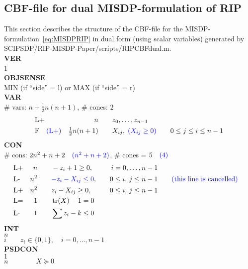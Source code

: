 \documentclass[11pt,a4paper]{article}
\DeclareMathOperator{\tr}{tr}
\theoremstyle{definition}
\begin{document}
\subsection{CBF-file for dual MISDP-formulation of RIP}
\label{sec:CBFdual}
This section describes the structure of the CBF-file for the
MISDP-formulation~\eqref{eq:MISDPRIP} in dual form (using scalar variables)
generated by
\textsf{SCIPSDP/RIP-MISDP-Paper/scripts/RIPCBFdual.m}.\\


{\footnotesize
\noindent
\textbf{VER} \\
1 \\
\textbf{OBJSENSE} \\
MIN (if ``side'' = l) \; or \; MAX (if ``side'' = r) \\
\textbf{VAR} \\
\# vars:  $n+\tfrac{1}{2}n(n+1)$, \qquad \# cones: $2$ \\
\[
  \begin{aligned}
    &\text{L+} &n \qquad & z_0,\dots,z_{n-1} \\
    &\text{F}\quad{\color{blue} (\text{L}+)}  &\tfrac{1}{2}n(n+1) \qquad & X_{ij},\;
    {\color{blue} (X_{ij} \geq 0)} \qquad 0 \leq j \leq i \leq n-1
  \end{aligned}
\]
\textbf{CON} \\
\# cons: $2n^2+n+2 \quad {\color{blue}(n^2+n+2)}$, \qquad
\# cones = $5 \quad {\color{blue} (4)}$\\
\[
  \begin{aligned}
    &\text{L+} &n \qquad & -z_i + 1 \geq 0, \quad & i = 0,\dots,n-1 \\
    &\text{L-} &n^2 \qquad & {\color{blue}-z_i - X_{ij} \leq 0},\quad & 0
    \leq i,\, j \leq n-1 &\qquad {\color{blue} \text{(this line is cancelled)}}\\
    &\text{L+} &n^2 \qquad & z_i - X_{ij} \geq 0,\quad & 0
    \leq i, \, j \leq n-1 \\
    &\text{L=}  &1 \qquad & \tr(X) - 1 = 0 \\
    &\text{L-}  &1 \qquad & \sum z_i - k \leq 0
  \end{aligned}
\]
\textbf{INT} \\
$n$ \\
$i \qquad z_i \in \{0,1\}, \quad i = 0,\dots,n-1$ \\
\textbf{PSDCON} \\
$1$  \\
$n \qquad \qquad X \succeq 0$ \\
}
\end{document}
